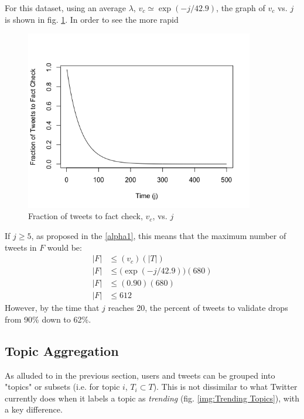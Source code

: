 \documentclass[NETN,manuscript]{stjour-new}
\begin{document}
For this dataset, using an average $\lambda$, $v_c \simeq \exp(-j/42.9)$, the graph of $v_c$ vs. $j$ is shown in fig. \ref{fig:v_c exp(-x/42.9)}. In order to see the more rapid 
\begin{figure}[h]
 \centering
  \includegraphics[width=10cm]{v_c e to the -x42.9.png}
  \caption{Fraction of tweets to fact check, $v_c$, vs. $j$}\label{fig:v_c exp(-x/42.9)}
 \end{figure}
 
 If $j \geq 5$, as proposed in the \ref{alpha1}, this means that the maximum number of tweets in $F$ would be:
\[
 \begin{split}
 |F| & \leq (v_c)(|T|) \\
  |F| & \leq \big(\exp(-j/42.9)\big)(680) \\
 |F| & \leq (0.90)(680) \\
  |F| & \leq612
 \end{split}
\]
However, by the time that $j$ reaches 20, the percent of tweets to validate drops from 90\% down to 62\%. 

\subsection{Topic Aggregation}
As alluded to in the previous section, users and tweets can be grouped into "topics" or subsets (i.e.  for topic $i$, $T_i \subset T$). This is not dissimilar to what Twitter currently does when it labels a topic as \textit{trending} (fig. \ref{img:Trending Topics}), with a key difference. 
\end{document}
